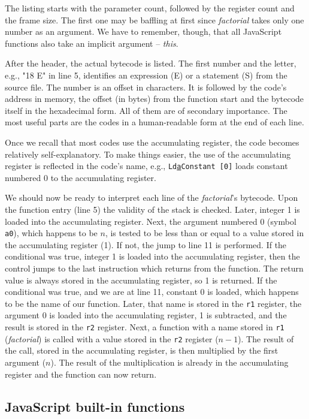 The listing starts with the parameter count, followed by the register count and the frame size. 
The first one may be baffling at first since \emph{factorial} takes only one number as an argument. 
We have to remember, though, 
that all JavaScript functions also take an implicit argument -- \emph{this}.

After the header, the actual bytecode is listed. The first number and the letter, e.g., "18 E" in line 5, identifies an expression (E)
or a statement (S) from the source file. The number is an offset in characters.
It is followed by the code's address in memory, the offset (in bytes) from the function start 
and the bytecode itself in the hexadecimal form. All of them are of secondary importance. 
The most useful parts are the codes in a human-readable form at the end of each line.

Once we recall that most codes use the accumulating register, the code becomes relatively self-explanatory.
To make things easier, the use of the accumulating register is reflected in the code's name, e.g., 
\texttt{Ld\underline{a}Constant [0]} loads constant numbered 0 to the accumulating register.

We should now be ready to interpret each line of the \emph{factorial}'s bytecode.
Upon the function entry (line 5) the validity of the stack is checked. Later, integer 1 is loaded into
the accumulating register. Next, the argument numbered 0 (symbol \texttt{a0}), which happens to be $n$, is tested 
to be less than or equal to a value stored in the accumulating register (1).
If not, the jump to line 11 is performed. If the conditional was true, integer 1 is loaded
into the accumulating register, then the control jumps to the last instruction which returns from the function.
The return value is always stored in the accumulating register, so 1 is returned.
If the conditional was true, and we are at line 11, constant 0 is loaded, which happens to be the name of our function.
Later, that name is stored in the \texttt{r1} register, the argument 0 is loaded into the accumulating register, 
1 is subtracted, and the result is stored in the \texttt{r2} register. 
Next, a function with a name stored in \texttt{r1} (\emph{factorial}) is called with a value stored in 
the \texttt{r2} register ($n-1$). The result of the call, stored in the accumulating register, is then multiplied by the first argument
($n$). The result of the multiplication is already in the accumulating register and the function can now return.


\subsection{JavaScript built-in functions}
\label{v8-builtins}

